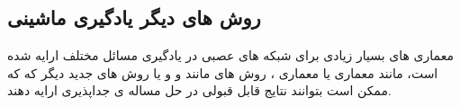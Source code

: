 \subsection{روش های دیگر یادگیری ماشینی}
معماری های بسیار زیادی برای شبکه های عصبی در یادگیری مسائل مختلف ارایه شده است، مانند معماری
یا معماری
،
روش های
مانند
و
و یا روش های جدید دیگر که
که ممکن است بتوانند نتایج قابل قبولی در حل مساله ی جداپذیری ارایه دهند.
